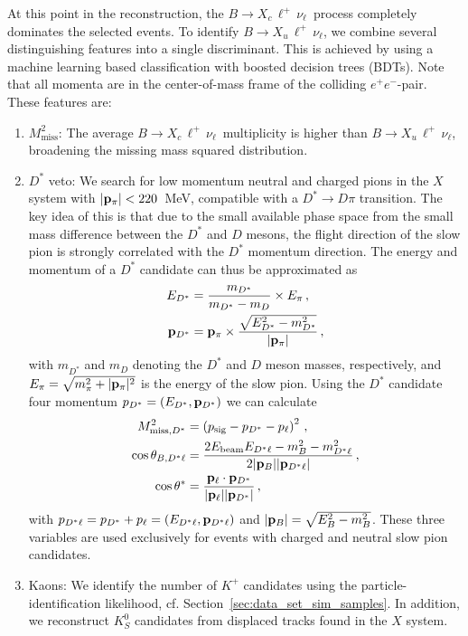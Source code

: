 \documentclass[twocolumn,aps,prd,superscriptaddress,nofootinbib,floatfix,preprintnumbers,a4]{revtex4-1}
\newcommand{\bulnu}{\ensuremath{B \to X_u \, \ell^+\, \nu_{\ell}}\xspace}
\newcommand{\bclnu}{\ensuremath{B \to X_c \, \ell^+\, \nu_{\ell}}\xspace}
\begin{document}
At this point in the reconstruction, the \bclnu\ process completely dominates the selected events. To identify \bulnu, we combine several distinguishing features into a single discriminant. This is achieved by using a machine learning based classification with boosted decision trees (BDTs). Note that all momenta are in the center-of-mass frame of the colliding $e^+ e^-$-pair. These features are:
\begin{enumerate}
 \item $M_{\mathrm{miss}}^2$: The average \bclnu\ multiplicity is higher than \bulnu, broadening the missing mass squared distribution.
 \item $D^*$ veto: We search for low momentum neutral and charged pions in the $X$ system with \mbox{$| \bold{p}_\pi| < 220$ MeV}, compatible with a $D^* \to D \pi$ transition. The key idea of this is that due to the small available phase space from the small mass difference between the $D^*$ and $D$ mesons, the flight direction of the slow pion is strongly correlated with the $D^*$ momentum direction. The energy and momentum of a $D^*$ candidate can thus be approximated as
 \begin{align}
   E_{D^*} & = \frac{m_{D^*}}{m_{D^*} - m_D} \times E_{\pi} \, , \nonumber \\
    \bold{p}_{D^*} & = \bold{p_\pi} \times \frac{\sqrt{  E_{D^*}^2 - m_{D^*}^2}}{|\bold{p}_\pi|}  \, ,
 \end{align}
 with $m_{D^*}$ and $m_D$ denoting the $D^*$ and $D$ meson masses, respectively, and $E_{\pi} = \sqrt{  m_{\pi}^2 + |\bold{p}_\pi|^2 }$ is the energy of the slow pion. Using the $D^*$ candidate four momentum $p_{D^*} = (E_{D^*}, \bold{p}_{D^*} )$ we can calculate 
 \begin{align}
  M_{\mathrm{miss}, D^*}^2 & = \left(p_{\mathrm{sig}} - p_{D^*} - p_\ell  \right)^2 \, , \nonumber \\
  \cos \theta_{B, D^*\ell} & = \frac{ 2 E_{\mathrm{beam}} E_{D^*\ell} - m_B^2 - m_{D^*\ell}^2 }{ 2 |\bold{p}_{B}| | \bold{p}_{D^*\ell}| }\, , \nonumber \\
  \cos \theta^* & = \frac{ \bold{p}_\ell \cdot \bold{p}_{D^*} }{ |\bold{p}_\ell| |\bold{p}_{D^*}| } \, ,
 \end{align}
with $p_{D^* \ell} = p_{D^*} + p_\ell = (E_{D^*\ell}, \bold{p}_{D^*\ell})$ and \mbox{$ |\bold{p}_{B}| = \sqrt{E_B^2 - m_B^2 }$}. These three variables are used exclusively for events with charged and neutral slow pion candidates.
\item Kaons: We identify the number of $K^+$ candidates using the particle-identification likelihood, cf. Section~\ref{sec:data_set_sim_samples}. In addition, we reconstruct $K_S^0$ candidates from displaced tracks found in the $X$ system. 

\end{enumerate}
\end{document}
